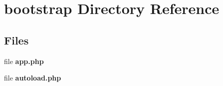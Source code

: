 \section{bootstrap Directory Reference}
\label{dir_f483d12058ed1bf083ef5e1385958d6f}
\subsection*{Files}
\begin{DoxyCompactItemize}
\item 
file {\bf app.\+php}
\item 
file {\bf autoload.\+php}
\end{DoxyCompactItemize}
